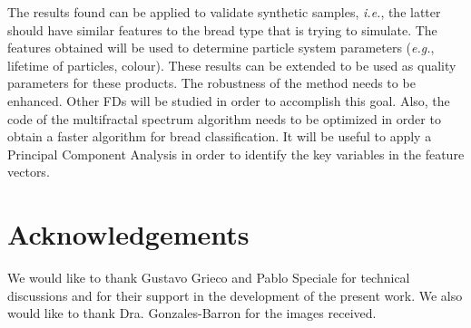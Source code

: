 \documentclass[oneside,a4paper,english,links]{amca}
\begin{document}
The results found can be applied to validate synthetic samples, {\em i.e.}, the latter should have similar features to the bread type that is trying to simulate. The features obtained will be used to determine particle system parameters ({\em e.g.}, lifetime of particles, colour). These results can be extended to be used as quality parameters for these products. The robustness of the method needs to be enhanced. Other FDs will be studied in order to accomplish this goal. Also, the code of the multifractal spectrum algorithm needs to be optimized in order to obtain a faster algorithm for bread classification. It will be useful to apply a Principal Component Analysis in order to identify the key variables in the feature vectors. 

\section{Acknowledgements}
We would like to thank Gustavo Grieco and Pablo Speciale for technical discussions and for their support in the development of the present work. We also would like to thank Dra. Gonzales-Barron for the images received.

%

\end{document}
